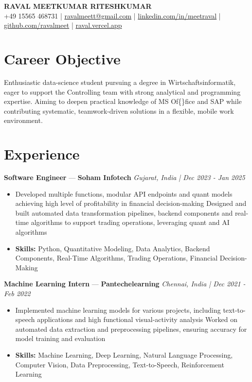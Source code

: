 \documentclass[a4paper,10pt]{article}
\begin{document}
\begin{center}
  {\Large\bfseries RAVAL MEETKUMAR RITESHKUMAR}\\[2pt]
  {\small +49 15565 468731 \;|\; \href{mailto:ravalmeett@gmail.com}{ravalmeett@gmail.com} \;|\; \href{https://www.linkedin.com/in/meetraval/}{linkedin.com/in/meetraval} \;|\; \href{https://github.com/ravalmeet}{github.com/ravalmeet} \;|\; \href{https://raval.vercel.app/}{raval.vercel.app}}
\end{center}
\vspace{-3pt}

\section*{Career Objective}
Enthusiastic data-science student pursuing a degree in Wirtschaftsinformatik, eager to support the Controlling team with strong analytical and programming expertise. Aiming to deepen practical knowledge of MS Of\{\}fice and SAP while contributing systematic, teamwork-driven solutions in a flexible, mobile work environment.\par

\section*{Experience}
\textbf{Software Engineer} — \textbf{Soham Infotech} \hfill \textit{Gujarat, India \;|\; Dec 2023 - Jan 2025}\par
\vspace{1pt}
\begin{itemize}
  \item Developed multiple functions, modular API endpoints and quant models achieving high level of profitability in financial decision-making Designed and built automated data transformation pipelines, backend components and real-time algorithms to support trading operations, leveraging quant and AI algorithms
  \item \textbf{Skills:} Python, Quantitative Modeling, Data Analytics, Backend Components, Real-Time Algorithms, Trading Operations, Financial Decision-Making
\end{itemize}
\vspace{3pt}
\textbf{Machine Learning Intern} — \textbf{Pantechelearning} \hfill \textit{Chennai, India \;|\; Dec 2021 - Feb 2022}\par
\vspace{1pt}
\begin{itemize}
  \item Implemented machine learning models for various projects, including text-to-speech applications and high functional visual-activity analysis Worked on automated data extraction and preprocessing pipelines, ensuring accuracy for model training and evaluation
  \item \textbf{Skills:} Machine Learning, Deep Learning, Natural Language Processing, Computer Vision, Data Preprocessing, Text-to-Speech, Reinforcement Learning
\end{itemize}
\end{document}
